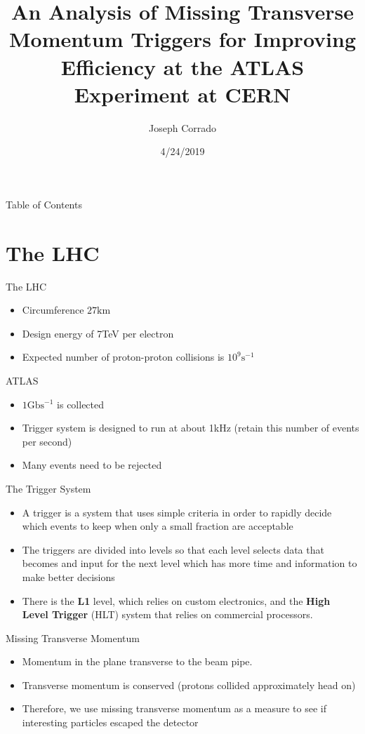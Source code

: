 \documentclass[]{beamer}
\title{An Analysis of Missing Transverse Momentum Triggers for Improving Efficiency at the ATLAS Experiment at CERN}
\author{Joseph Corrado}                 %
\institute{New York University}      %
\date{4/24/2019}                    %
\begin{document}
\begin{frame}
  \titlepage
\end{frame}
\begin{frame}{Table of Contents}
        \tableofcontents
\end{frame}
\section{The LHC}
\begin{frame}{The LHC}
        \begin{itemize}
                \item Circumference $27\textrm{km}$
                \item Design energy of 7TeV per electron
                \item Expected number of proton-proton collisions is $10^9\textrm{s}^{-1}$
        \end{itemize}
\end{frame}
\begin{frame}{ATLAS}
        \begin{itemize}
                \item $1\textrm{Gb}\textrm{s}^{-1}$ is collected
                \item Trigger system is designed to run at about 1kHz (retain this number of events per second)
                \item Many events need to be rejected
        \end{itemize}
\end{frame}
\begin{frame}{The Trigger System}
        \begin{itemize}
                \item A trigger is a system that uses simple criteria in order to rapidly decide which events to keep when only a small fraction are acceptable 
                \item The triggers are divided into levels so that each level selects data that becomes and input for the next level which has more time and information to make better decisions
                \item There is the \textbf{L1} level, which relies on custom electronics, and the \textbf{High Level Trigger} (HLT) system that relies on commercial processors.
        \end{itemize}
\end{frame}
\begin{frame}{Missing Transverse Momentum}
        \begin{itemize}
                \item Momentum in the plane transverse to the beam pipe.
                \item Transverse momentum is conserved (protons collided approximately head on)
				\item Therefore, we use missing transverse momentum as a measure to see if interesting particles escaped the detector
        \end{itemize}
\end{frame}
\end{document}
